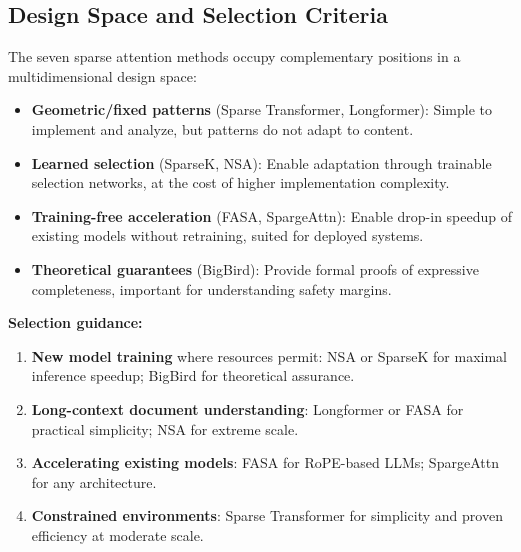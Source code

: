 \subsection{Design Space and Selection Criteria}

The seven sparse attention methods occupy complementary positions in a multidimensional design space:

\begin{itemize}[leftmargin=*]
    \item \textbf{Geometric/fixed patterns} (Sparse Transformer, Longformer): Simple to implement and analyze, but patterns do not adapt to content.
    \item \textbf{Learned selection} (SparseK, NSA): Enable adaptation through trainable selection networks, at the cost of higher implementation complexity.
    \item \textbf{Training-free acceleration} (FASA, SpargeAttn): Enable drop-in speedup of existing models without retraining, suited for deployed systems.
    \item \textbf{Theoretical guarantees} (BigBird): Provide formal proofs of expressive completeness, important for understanding safety margins.
\end{itemize}

\textbf{Selection guidance:}
\begin{enumerate}[leftmargin=*]
    \item \textbf{New model training} where resources permit: NSA or SparseK for maximal inference speedup; BigBird for theoretical assurance.
    \item \textbf{Long-context document understanding}: Longformer or FASA for practical simplicity; NSA for extreme scale.
    \item \textbf{Accelerating existing models}: FASA for RoPE-based LLMs; SpargeAttn for any architecture.
    \item \textbf{Constrained environments}: Sparse Transformer for simplicity and proven efficiency at moderate scale.
\end{enumerate}

